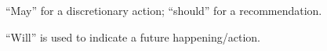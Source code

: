 \documentclass[titlepage]{article}
\renewcommand{\arraystretch}{1.4}
\begin{document}
“May” for a discretionary action; “should” for a recommendation. 

“Will” is used to indicate a future happening/action. 



\end{document}
